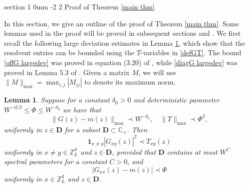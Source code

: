 \documentclass{article}
\makeatletter
\newcommand{\1}{\mathds{1}}
\numberwithin{equation}{section}
\newcommand{\al}{\alpha}
\newcommand{\be}{\begin{equation}}
\newcommand{\ee}{\end{equation}}
\newcommand{\fa}{{\mathfrak a}}
\renewcommand{\leq}{\leqslant}
\renewcommand{\le}{\leq}
\newcommand{\C}{\mathbb{C}}
\newcommand{\Z}{\mathbb{Z}}
\theoremstyle{plain} %
\newtheorem{lemma}[theorem]{Lemma}
\theoremstyle{remark}
\renewcommand{\section}{\@startsection
{section}%
{1}%
{0mm}%
{-2\baselineskip}%
{2\baselineskip}%
{\normalfont\large\scshape\centering}} %
\makeatother
\begin{document}
%
% 
%
%

\section{Proof of Theorem \ref{main thm}}\label{sec pfmain}

In this section, we give an outline of the proof of Theorem \ref{main thm}. Some lemmas used in the proof will be proved in subsequent sections and \cite{PartII_high}. We first recall the following large deviation estimates in Lemma \ref{lem G<T}, which show that the resolvent entries can be bounded using the $T$-variables in \eqref{defGT}. The bound \eqref{offG largedev} was proved in equation (3.20) of \cite{PartIII}, while \eqref{diagG largedev} was proved in Lemma 5.3 of \cite{delocal}. Given a matrix $M$, we will use $\|M\|_{\max}=\max_{i,j}|M_{ij}|$ to denote its maximum norm. 

\begin{lemma}\label{lem G<T}
Suppose for a constant $\delta_0>0$ and deterministic parameter $W^{-d/2}\le \Phi\le W^{-\delta_0}$ we have that
\be\label{initialGT} 
\|G(z)-m(z)\|_{\max}\prec W^{-\delta_0},\quad \|T\|_{\max} \prec \Phi^2 ,
\ee
uniformly in $z\in \mathbf D$ for a subset $\mathbf D\subset \C_+$. Then 
\be\label{offG largedev} \mathbf 1_{x\ne y} |G_{xy}(z)|^2  \prec T_{xy}(z)\ee
uniformly in $x\ne y \in \Z_L^d$ and $z\in \mathbf D$, provided that $\mathbf D$ contains at most $W^{C}$ spectral parameters for a constant $C>0$, and
\be\label{diagG largedev} |G_{xx}(z)-m(z)| \prec \Phi
\ee
	uniformly in $x\in \Z_L^d$ and $z\in \mathbf D$.
\end{lemma}
\end{document}
